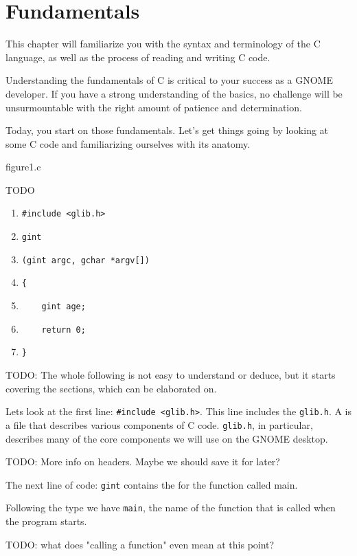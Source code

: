 \chapter{Fundamentals}

This chapter will familiarize you with the syntax and terminology of the C
language, as well as the process of reading and writing C code.

Understanding the fundamentals of C is critical to your success as a GNOME
developer. If you have a strong understanding of the basics, no challenge will 
be unsurmountable with the right amount of patience and determination.

Today, you start on those fundamentals. Let's get things going by looking at
some C code and familiarizing ourselves with its anatomy.


\begin{code}{figure1.c}

\end{code}

TODO
\begin{enumerate}
\item \verb|#include <glib.h>|
\item \verb|gint|
\item \verb|(gint argc, gchar *argv[])|
\item \verb|{|
\item \verb|    gint age;|
\item \verb|    return 0;|
\item \verb|}|
\end{enumerate}

TODO: The whole following is not easy to understand or deduce, but it
starts covering the sections, which can be elaborated on.

Lets look at the first line: \verb|#include <glib.h>|. This line includes
the  \verb|glib.h|. A  is a file that describes
various components of C code. \verb|glib.h|, in particular, describes many
of the core components we will use on the GNOME desktop.

TODO: More info on headers. Maybe we should save it for later?

The next line of code: \verb|gint| contains the  for the
function called main.

Following the type we have \verb|main|, the name of the function that is
called when the program starts.

TODO: what does "calling a function" even mean at this point?



